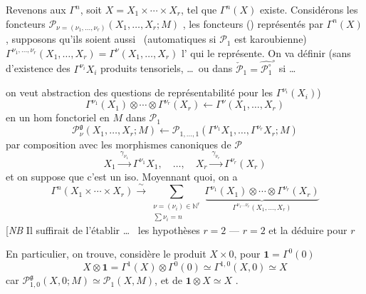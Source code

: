 \documentclass[11pt,a4paper]{article}
\begin{document}
Revenons aux $\Gamma^{n}$, soit $X = X_1 \times \cdots \times X_r$, tel
que $\Gamma^{n}(X)$ existe. Considérons les \struck{\ill{}} foncteurs
$\mathcal{P}_{\nu = (\nu_1, \ldots, \nu_r)}(X_1, \ldots, X_r; M)$
, les foncteurs ()
représentés par $\Gamma^{n}(X)$, supposons qu'ils soient aussi
\ (automatiques si $\mathcal{P}_1$ est
karoubienne)  $\Gamma^{\nu_1, \ldots, \nu_r}(X_1, \ldots,
X_r) = \Gamma^{\nu}(X_1, \ldots, X_r)$ l' \struck{\ill{}} qui
le représente. \struck{\ill{}} On va définir (sans 
d'existence des $\Gamma^{\nu_i} X_i$  produits tensoriels,
\ldots\ ou dans $\check{\mathcal{P}}_1 =
\widehat{\mathcal{P}_1^{\circ}}^{\circ}$ si \ldots
{}

on veut  abstraction des questions de représentabilité
 pour les $\Gamma^{\nu_i}(X_i)$)
\[
\Gamma^{\nu_1}(X_1) \otimes \cdots \otimes \Gamma^{\nu_r}(X_r)
\longleftarrow \Gamma^{\nu}(X_1, \ldots, X_r)
\]
en  un hom fonctoriel en $M$ dans $\mathcal{P}_1$
\[
\mathcal{P}^{\mathfrak{g}}_{\nu}(X_1, \ldots, X_r; M) \longleftarrow
\mathcal{P}_{1, \ldots, 1}(\Gamma^{\nu_1} X_1, \ldots,
\Gamma^{\nu_r} X_r; M)
\]
par composition avec les morphismes canoniques de $\mathcal{P}$
\[
X_1 \xrightarrow{\ \gamma_{\nu_1}\ } \Gamma^{\nu_1} X_1, \quad \ldots,
\quad X_r \xrightarrow{\ \gamma_{\nu_r}\ } \Gamma^{\nu_r}(X_r)
\]
et on suppose que c'est  un iso. Moyennant
quoi, on a
\[
\Gamma^{n}(X_1 \times \cdots \times X_r) \xrightarrow{\ \sim\ }
\sum_{\substack{\nu = (\nu_i) \in \mathbb{N}^{r} \\ \sum \nu_i = n}}
\underbrace{\Gamma^{\nu_1}(X_1) \otimes \cdots \otimes
\Gamma^{\nu_r}(X_r)}_{\Gamma^{\nu_1 \ldots \nu_r}(X_1, \ldots, X_r)}
\]
[\emph{NB} Il suffirait de l'établir \ldots\  les
hypothèses  $r = 2$ ---  $r = 2$
 et la déduire  pour $r$

En particulier, on trouve,   \ill{}
considère le produit $X \times 0$, pour $\mathbf{1} = \Gamma^{0}(0)$
\[
X \otimes \mathbf{1} = \Gamma^{1}(X) \otimes \Gamma^{0}(0) \simeq
\Gamma^{1,0}(X, 0) \simeq X
\]
car $\mathcal{P}^{\mathfrak{g}}_{1,0}(X, 0; M) \simeq \mathcal{P}_1(X, M)$,
et de  $\mathbf{1} \otimes X \simeq X$
\struck{\ill{}}.
\end{document}
